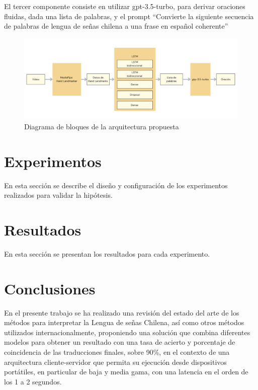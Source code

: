 \documentclass{article}
\begin{document}
El tercer componente consiste en utilizar gpt-3.5-turbo, para derivar oraciones fluidas, dada una lista de palabras, y el prompt “Convierte la siguiente secuencia de palabras de lengua de señas chilena a una frase en español coherente”

\begin{figure}[!hbtp]
    \centering
    \includegraphics[width=5in]{figuras/architecture-diagram.png}
		\caption{Diagrama de bloques de la arquitectura propuesta}
		\label{fig1}
\end{figure}

\section{Experimentos}

En esta sección se describe el diseño y configuración de los experimentos realizados para validar la hipótesis.


\section{Resultados}

En esta sección se presentan los resultados para cada experimento.


\section{Conclusiones}

En el presente trabajo se ha realizado una revisión del estado del arte de los métodos para interpretar la Lengua de señas Chilena, así como otros métodos utilizados internacionalmente, proponiendo una solución que combina diferentes modelos para obtener un resultado con una tasa de acierto y porcentaje de coincidencia de las traducciones finales, sobre 90\%, en el contexto de una arquitectura cliente-servidor que permita su ejecución desde dispositivos portátiles, en particular de baja y media gama, con una latencia en el orden de los 1 a 2 segundos.
\end{document}
